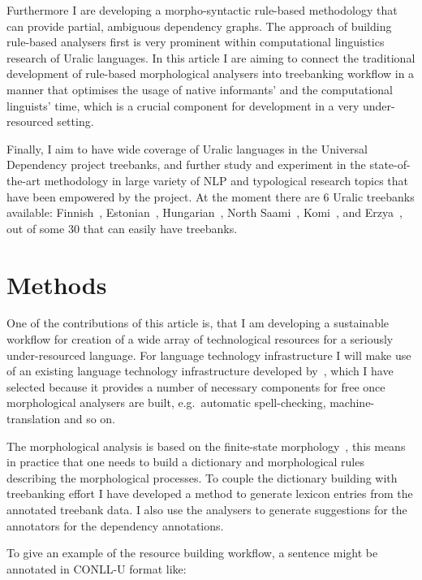 \documentclass{flammie}
\begin{document}
Furthermore I are developing a morpho-syntactic rule-based methodology that can
provide partial, ambiguous dependency graphs. The approach of building
rule-based analysers first is very prominent within computational linguistics
research of Uralic languages. In this article I are aiming to connect the
traditional development of rule-based morphological analysers into treebanking
workflow in a manner that optimises the usage of native informants' and the
computational linguists' time, which is a crucial component for development in
a very under-resourced setting.

Finally, I aim to have wide coverage of Uralic languages in the Universal
Dependency project treebanks, and further study and experiment in the
state-of-the-art methodology in large variety of NLP and typological research
topics that have been empowered by the project. At the moment there are 6 Uralic
treebanks available:
Finnish~\cite{haverinen2014building,voutilainen2012specifying},
Estonian~\cite{muischnek2016estonian},
Hungarian~\cite{vincze2010hungarian},
North Saami~\cite{sheyanova2017annotation},
Komi~\cite{partanen2018first}, and
Erzya~\cite{rueter2018towards}, out of some 30 that can easily have treebanks.

\section{Methods}
\label{sec:methods}

One of the contributions of this article is, that I am developing a sustainable
workflow for creation of a wide array of technological resources for a seriously
under-resourced language. For language technology infrastructure I will make
use of an existing language technology infrastructure developed
by~\cite{moshagen2014open}, which I have selected because it provides a number
of necessary components for free once morphological analysers are built, e.g.\
automatic spell-checking, machine-translation and so on.

The morphological analysis is based on the finite-state
morphology~\cite{beesley2003finite}, this means in practice that one needs to
build a dictionary and morphological rules describing the morphological
processes. To couple the dictionary building with treebanking effort I have
developed a method to generate lexicon entries from the annotated treebank data.
I also use the analysers to generate suggestions for the annotators for the
dependency annotations.

To give an example of the resource building workflow, a sentence might be
annotated in CONLL-U format like:
\end{document}
